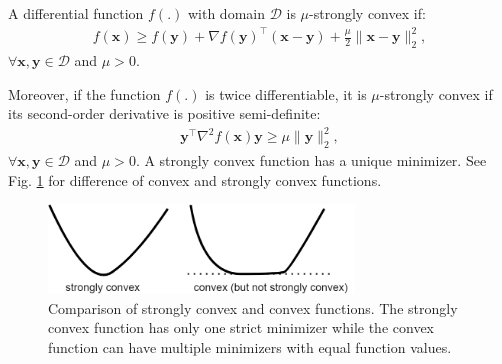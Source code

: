 \documentclass[lang=cn,10pt]{gorgeousnbook}
\numberwithin{equation}{section}%
\numberwithin{figure}{section}%
\begin{document}
\begin{definition}
A differential function $f(.)$ with domain $\mathcal{D}$ is $\mu$-strongly convex if:
\begin{align}\label{equation_strongly_convex_function_firstDerivative}
f(\boldsymbol{x}) \geq f(\boldsymbol{y}) + \nabla f(\boldsymbol{y})^\top (\boldsymbol{x} - \boldsymbol{y}) + \frac{\mu}{2} \|\boldsymbol{x} - \boldsymbol{y}\|_2^2,
\end{align}
$\forall \boldsymbol{x}, \boldsymbol{y} \in \mathcal{D}$ and $\mu > 0$.

Moreover, if the function $f(.)$ is twice differentiable, it is $\mu$-strongly convex if its second-order derivative is positive semi-definite:
\begin{align}\label{equation_strongly_convex_function_secondDerivative}
\boldsymbol{y}^\top \nabla^2 f(\boldsymbol{x}) \boldsymbol{y} \geq \mu \|\boldsymbol{y}\|_2^2,
\end{align}
$\forall \boldsymbol{x}, \boldsymbol{y} \in \mathcal{D}$ and $\mu > 0$.
A strongly convex function has a unique minimizer. See Fig. \ref{figure_stronglyConvex} for difference of convex and strongly convex functions. 
\end{definition}

\begin{figure}[!t]
\centering
\includegraphics[width=3.2in]{./images/stronglyConvex}
\caption{Comparison of strongly convex and convex functions. The strongly convex function has only one strict minimizer while the convex function can have multiple minimizers with equal function values.}
\label{figure_stronglyConvex}
\end{figure}


\end{document}
